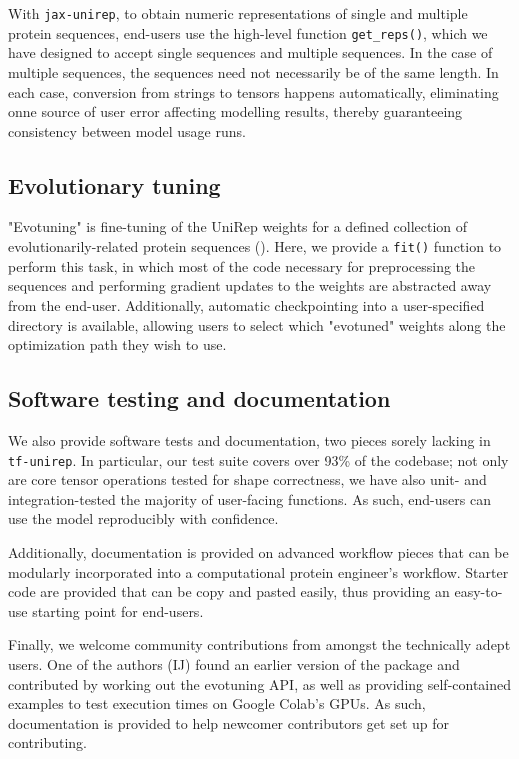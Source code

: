 \documentclass[twoside,11pt]{article}
\begin{document}
With \verb|jax-unirep|,
to obtain numeric representations of single and multiple protein sequences,
end-users use the high-level function \verb|get_reps()|,
which we have designed to accept single sequences and multiple sequences.
In the case of multiple sequences, the sequences need not necessarily be
of the same length.
In each case, conversion from strings to tensors happens automatically,
eliminating onne source of user error affecting modelling results,
thereby guaranteeing consistency between model usage runs.

\subsection{Evolutionary tuning}

"Evotuning" is fine-tuning of the UniRep weights
for a defined collection
of evolutionarily-related protein sequences (\cite{alley2019unified}).
Here, we provide a \verb|fit()| function to perform this task,
in which most of the code necessary for preprocessing the sequences
and performing gradient updates to the weights
are abstracted away from the end-user.
Additionally, automatic checkpointing
into a user-specified directory is available,
allowing users to select
which "evotuned" weights along the optimization path
they wish to use.

\subsection{Software testing and documentation}

We also provide software tests and documentation,
two pieces sorely lacking in \verb|tf-unirep|.
In particular, our test suite covers over 93\% of the codebase;
not only are core tensor operations tested for shape correctness,
we have also unit- and integration-tested
the majority of user-facing functions.
As such, end-users can use the model reproducibly with confidence.

Additionally, documentation is provided on advanced workflow pieces
that can be modularly incorporated
into a computational protein engineer's workflow.
Starter code are provided that can be copy and pasted easily,
thus providing an easy-to-use starting point for end-users.

Finally, we welcome community contributions
from amongst the technically adept users.
One of the authors (IJ) found an earlier version of the package
and contributed by working out the evotuning API,
as well as providing self-contained examples to test execution times
on Google Colab's GPUs.
As such, documentation is provided to help newcomer contributors
get set up for contributing.
\end{document}
